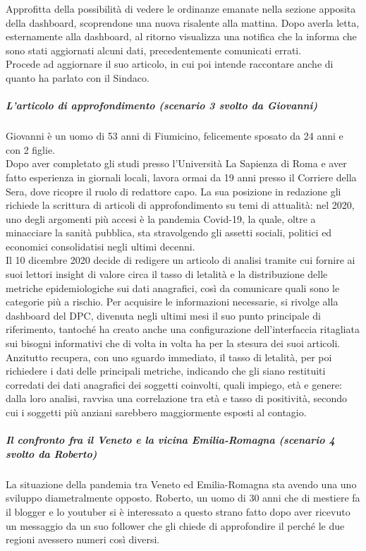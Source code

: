Approfitta della possibilità di vedere le ordinanze emanate nella sezione apposita della dashboard, scoprendone una nuova risalente alla mattina.
Dopo averla letta, esternamente alla dashboard, al ritorno visualizza una notifica che la informa che sono stati aggiornati alcuni dati, precedentemente comunicati errati.\\
Procede ad aggiornare il suo articolo, in cui poi intende raccontare anche di quanto ha parlato con il Sindaco.
\noindent
\subparagraph{L'articolo di approfondimento (scenario 3 svolto da Giovanni)}
Giovanni è un uomo di 53 anni di Fiumicino, felicemente sposato da 24 anni e con 2 figlie.\\
Dopo aver completato gli studi presso l'Università La Sapienza di Roma e aver fatto esperienza in giornali locali, lavora ormai da 19 anni presso il Corriere della Sera, dove ricopre il ruolo di redattore capo.
La sua posizione in redazione gli richiede la scrittura di articoli di approfondimento su temi di attualità: nel 2020, uno degli argomenti più accesi è la pandemia Covid-19, la quale, oltre a minacciare la sanità pubblica, sta stravolgendo gli assetti sociali, politici ed economici consolidatisi negli ultimi decenni.\\
Il 10 dicembre 2020 decide di redigere un articolo di analisi tramite cui fornire ai suoi lettori insight di valore circa il tasso di letalità e la distribuzione delle metriche epidemiologiche sui dati anagrafici, così da comunicare quali sono le categorie più a rischio.
Per acquisire le informazioni necessarie, si rivolge alla dashboard del DPC, divenuta negli ultimi mesi il suo punto principale di riferimento, tantoché ha creato anche una configurazione dell'interfaccia ritagliata sui bisogni informativi che di volta in volta ha per la stesura dei suoi articoli.
Anzitutto recupera, con uno sguardo immediato, il tasso di letalità, per poi richiedere i dati delle principali metriche, indicando che gli siano restituiti corredati dei dati anagrafici dei soggetti coinvolti, quali impiego, età e genere: dalla loro analisi, ravvisa una correlazione tra età e tasso di positività, secondo cui i soggetti più anziani sarebbero maggiormente esposti al contagio. 
\noindent
\subparagraph{Il confronto fra il Veneto e la vicina Emilia-Romagna (scenario 4 svolto da Roberto)}
La situazione della pandemia tra Veneto ed Emilia-Romagna sta avendo una uno sviluppo diametralmente opposto.
Roberto, un uomo di 30 anni che di mestiere fa il blogger e lo youtuber si è interessato a questo strano fatto dopo aver ricevuto un messaggio da un suo follower che gli chiede di approfondire il perché le due regioni avessero numeri così diversi.\\
